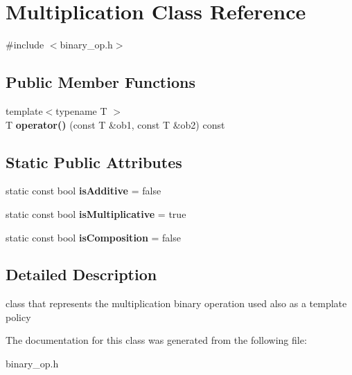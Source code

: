 \hypertarget{classMultiplication}{
\section{\-Multiplication \-Class \-Reference}
\label{classMultiplication}
}


{\ttfamily \#include $<$binary\-\_\-op.\-h$>$}

\subsection*{\-Public \-Member \-Functions}
\begin{DoxyCompactItemize}
\item 
\hypertarget{classMultiplication_abc832d7341a7f4a33054e41b8a6883da}{
{\footnotesize template$<$typename T $>$ }\\\-T {\bfseries operator()} (const \-T \&ob1, const \-T \&ob2) const }
\label{classMultiplication_abc832d7341a7f4a33054e41b8a6883da}

\end{DoxyCompactItemize}
\subsection*{\-Static \-Public \-Attributes}
\begin{DoxyCompactItemize}
\item 
\hypertarget{classMultiplication_a37f52c627c1caa3a1ba0388de58c5dbd}{
static const bool {\bfseries is\-Additive} = false}
\label{classMultiplication_a37f52c627c1caa3a1ba0388de58c5dbd}

\item 
\hypertarget{classMultiplication_aaf72f7c6c05f7ed984c8e997e0505d60}{
static const bool {\bfseries is\-Multiplicative} = true}
\label{classMultiplication_aaf72f7c6c05f7ed984c8e997e0505d60}

\item 
\hypertarget{classMultiplication_adbcbdd5feb18d22c1765fbe1b7829840}{
static const bool {\bfseries is\-Composition} = false}
\label{classMultiplication_adbcbdd5feb18d22c1765fbe1b7829840}

\end{DoxyCompactItemize}


\subsection{\-Detailed \-Description}
class that represents the multiplication binary operation used also as a template policy 

\-The documentation for this class was generated from the following file\-:\begin{DoxyCompactItemize}
\item 
binary\-\_\-op.\-h\end{DoxyCompactItemize}
